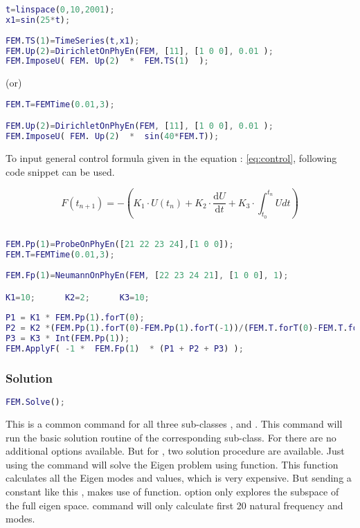 \documentclass[main.tex]{subfiles}
\begin{document}
\begin{lstlisting}[language=matlab]
t=linspace(0,10,2001);
x1=sin(25*t);  
    
FEM.TS(1)=TimeSeries(t,x1);
FEM.Up(2)=DirichletOnPhyEn(FEM, [11], [1 0 0], 0.01 );
FEM.ImposeU( FEM. Up(2)  *  FEM.TS(1)  );
\end{lstlisting}

\begin{center}
(or)
\end{center}


\begin{lstlisting}[language=matlab]
FEM.T=FEMTime(0.01,3);

FEM.Up(2)=DirichletOnPhyEn(FEM, [11], [1 0 0], 0.01 );
FEM.ImposeU( FEM. Up(2)  *  sin(40*FEM.T));
\end{lstlisting}To input general control formula given in the equation : \ref{eq:control}, following code snippet can be used. 

\begin{equation}\label{eq:control}
F(t_{n+1})=-(K_1 \cdot U(t_{n})+K_2\cdot\frac{\text{d}U}{\text{d}t}+K_3\cdot\int_{t_0}^{t_n} U dt)
\end{equation}

\begin{lstlisting}[language=matlab]

FEM.Pp(1)=ProbeOnPhyEn([21 22 23 24],[1 0 0]);
FEM.T=FEMTime(0.01,3);
    
FEM.Fp(1)=NeumannOnPhyEn(FEM, [22 23 24 21], [1 0 0], 1);

K1=10;      K2=2;      K3=10;
    
P1 = K1 * FEM.Pp(1).forT(0);
P2 = K2 *(FEM.Pp(1).forT(0)-FEM.Pp(1).forT(-1))/(FEM.T.forT(0)-FEM.T.forT(-1));
P3 = K3 * Int(FEM.Pp(1));
FEM.ApplyF( -1 *  FEM.Fp(1)  * (P1 + P2 + P3) );
\end{lstlisting}




\subsubsection{Solution}
\begin{lstlisting}[language=matlab]
FEM.Solve();
\end{lstlisting}
This is a common command for all three sub-classes  ,  and . This command will run the basic solution routine of the corresponding sub-class. For  there are no additional options available. But for , two solution procedure are available. Just using the command  will solve the Eigen problem using  function. This function calculates all the Eigen modes and values, which is very expensive. But sending a constant  like this , makes use of   function.  option only explores the subspace of the full eigen space. command will only calculate first 20 natural frequency and modes.
\end{document}

